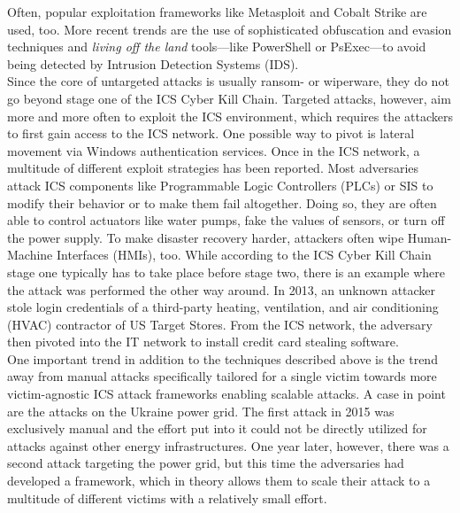 \documentclass[runningheads]{llncs}
\begin{document}
Often, popular exploitation frameworks like Metasploit and Cobalt Strike are used, too.
More recent trends are the use of sophisticated obfuscation and evasion techniques and \textit{living off the land} tools---like PowerShell or PsExec---to avoid being detected by Intrusion Detection Systems (IDS).\\
Since the core of untargeted attacks is usually ransom- or wiperware, they do not go beyond stage one of the ICS Cyber Kill Chain.
Targeted attacks, however, aim more and more often to exploit the ICS environment, which requires the attackers to first gain access to the ICS network.
One possible way to pivot is lateral movement via Windows authentication services.
Once in the ICS network, a multitude of different exploit strategies has been reported.
Most adversaries attack ICS components like Programmable Logic Controllers (PLCs) or SIS to modify their behavior or to make them fail altogether.
Doing so, they are often able to control actuators like water pumps, fake the values of sensors, or turn off the power supply.
To make disaster recovery harder, attackers often wipe Human-Machine Interfaces (HMIs), too.
While according to the ICS Cyber Kill Chain stage one typically has to take place before stage two, there is an example where the attack was performed the other way around.
In 2013, an unknown attacker stole login credentials of a third-party heating, ventilation, and air conditioning (HVAC) contractor of US Target Stores.
From the ICS network, the adversary then pivoted into the IT network to install credit card stealing software. \cite{hemsley.18}\\
One important trend in addition to the techniques described above is the trend away from manual attacks specifically tailored for a single victim towards more victim-agnostic ICS attack frameworks enabling scalable attacks.
A case in point are the attacks on the Ukraine power grid.
The first attack in 2015 was exclusively manual and the effort put into it could not be directly utilized for attacks against other energy infrastructures.
One year later, however, there was a second attack targeting the power grid, but this time the adversaries had developed a framework, which in theory allows them to scale their attack to a multitude of different victims with a relatively small effort. \cite{greenberg.17}
\end{document}
